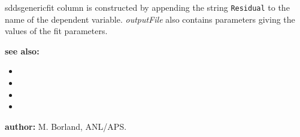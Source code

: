 \begin{sddsprog}{sddsgenericfit}
    column is constructed by appending the string \verb|Residual| to the name of the dependent variable. \emph{outputFile} also contains
    parameters giving the values of the fit parameters.
  \item \textbf{see also:}
    \begin{itemize}
      \item {}
      \item {}
      \item {}
      \item {}
    \end{itemize}
  \item \textbf{author:} M. Borland, ANL/APS.
\end{sddsprog}

